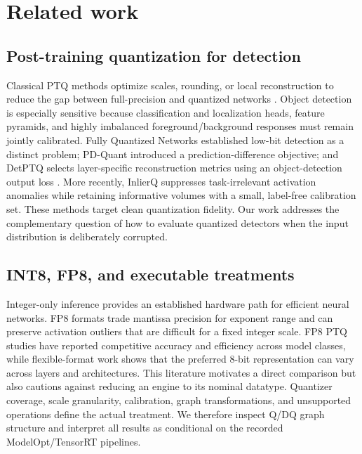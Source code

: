 \section{Related work}
\label{sec:related-work}

\subsection{Post-training quantization for detection}

Classical PTQ methods optimize scales, rounding, or local reconstruction to
reduce the gap between full-precision and quantized networks
\citep{nagel2020adaround,li2021brecq,hubara2021smallcalibration}. Object
detection is especially sensitive because classification and localization
heads, feature pyramids, and highly imbalanced foreground/background responses
must remain jointly calibrated. Fully Quantized Networks established low-bit
detection as a distinct problem\citep{li2019fullyquantized}; PD-Quant introduced
a prediction-difference objective\citep{liu2023pdquant}; and DetPTQ selects
layer-specific reconstruction metrics using an object-detection output loss
\citep{niu2023detptq}. More recently, InlierQ suppresses task-irrelevant
activation anomalies while retaining informative volumes with a small,
label-free calibration set\citep{kim2026inlierq}. These methods target clean
quantization fidelity. Our work addresses the complementary question of how to
evaluate quantized detectors when the input distribution is deliberately
corrupted.

\subsection{INT8, FP8, and executable treatments}

Integer-only inference provides an established hardware path for efficient
neural networks\citep{jacob2018integer}. FP8 formats trade mantissa precision
for exponent range and can preserve activation outliers that are difficult for
a fixed integer scale\citep{micikevicius2022fp8}. FP8 PTQ studies have reported
competitive accuracy and efficiency across model classes\citep{shen2024fp8},
while flexible-format work shows that the preferred 8-bit representation can
vary across layers and architectures\citep{zhang2023flexible8bit}. This
literature motivates a direct comparison but also cautions against reducing an
engine to its nominal datatype. Quantizer coverage, scale granularity,
calibration, graph transformations, and unsupported operations define the
actual treatment. We therefore inspect Q/DQ graph structure and interpret all
results as conditional on the recorded ModelOpt/TensorRT pipelines.

